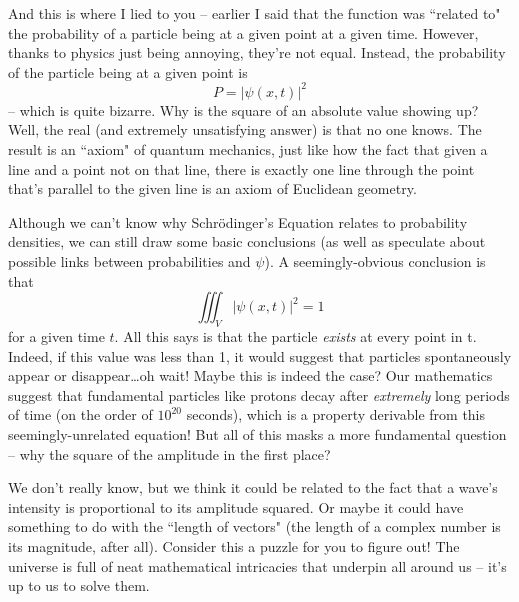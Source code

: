 \documentclass{article}
\begin{document}
And this is where I lied to you -- earlier I said that the function was ``related to" the probability of a particle being at a given point at a given time. However, thanks to physics just being annoying, they're not equal. Instead, the probability of the particle being at a given point is
\[P=|\psi(x,t)|^2\]
-- which is quite bizarre. Why is the square of an absolute value showing up? Well, the real (and extremely unsatisfying answer) is that no one knows. The result is an ``axiom" of quantum mechanics, just like how the fact that given a line and a point not on that line, there is exactly one line through the point that's parallel to the given line is an axiom of Euclidean geometry. 

Although we can't know why Schr\"odinger's Equation relates to probability densities, we can still draw some basic conclusions (as well as speculate about possible links between probabilities and $\psi$). A seemingly-obvious conclusion is that 
\[\iiint_V |\psi(x,t)|^2 = 1\]
for a given time $t.$ All this says is that the particle \textit{exists} at every point in t. Indeed, if this value was less than 1, it would suggest that particles spontaneously appear or disappear\dots oh wait! Maybe this is indeed the case? Our mathematics suggest that fundamental particles like protons decay after \textit{extremely} long periods of time (on the order of $10^{20}$ seconds), which is a property derivable from this seemingly-unrelated equation! But all of this masks a more fundamental question -- why the square of the amplitude in the first place?

We don't really know, but we think it could be related to the fact that a wave's intensity is proportional to its amplitude squared. Or maybe it could have something to do with the ``length of vectors" (the length of a complex number is its magnitude, after all). Consider this a puzzle for you to figure out! The universe is full of neat mathematical intricacies that underpin all around us -- it's up to us to solve them.
\end{document}
